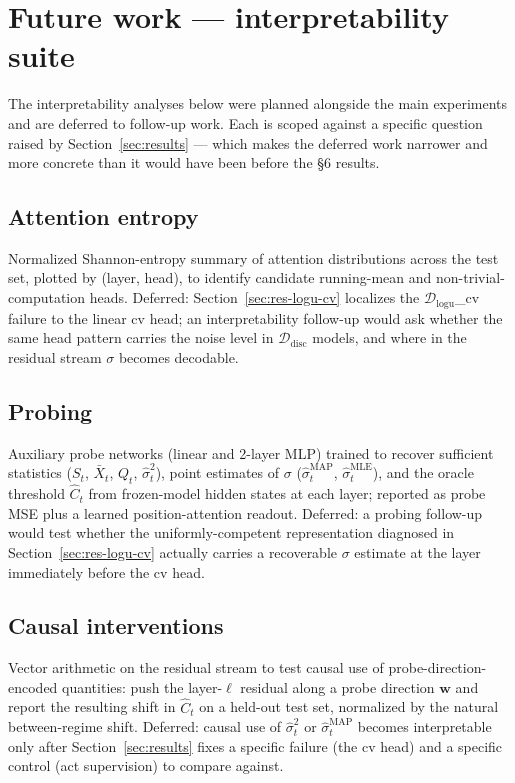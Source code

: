 \documentclass[11pt]{article}
\begin{document}
\section{Future work --- interpretability suite}
\label{sec:future}

The interpretability analyses below were planned alongside the main experiments and are deferred to follow-up work. Each is scoped against a specific question raised by Section~\ref{sec:results} --- which makes the deferred work narrower and more concrete than it would have been before the §6 results.

\subsection{Attention entropy}
\label{sec:fw-attn}

Normalized Shannon-entropy summary of attention distributions across the test set, plotted by (layer, head), to identify candidate running-mean and non-trivial-computation heads. Deferred: Section~\ref{sec:res-logu-cv} localizes the $\mathcal{D}_{\mathrm{logu}}$\_cv failure to the linear cv head; an interpretability follow-up would ask whether the same head pattern carries the noise level in $\mathcal{D}_{\mathrm{disc}}$ models, and where in the residual stream $\sigma$ becomes decodable.

\subsection{Probing}
\label{sec:fw-probe}

Auxiliary probe networks (linear and 2-layer MLP) trained to recover sufficient statistics ($S_t$, $\bar X_t$, $Q_t$, $\hat\sigma_t^2$), point estimates of $\sigma$ ($\hat\sigma_t^{\mathrm{MAP}}$, $\hat\sigma_t^{\mathrm{MLE}}$), and the oracle threshold $\widehat C_t$ from frozen-model hidden states at each layer; reported as probe MSE plus a learned position-attention readout. Deferred: a probing follow-up would test whether the uniformly-competent representation diagnosed in Section~\ref{sec:res-logu-cv} actually carries a recoverable $\sigma$ estimate at the layer immediately before the cv head.

\subsection{Causal interventions}
\label{sec:fw-intervention}

Vector arithmetic on the residual stream to test causal use of probe-direction-encoded quantities: push the layer-$\ell$ residual along a probe direction $\mathbf{w}$ and report the resulting shift in $\widehat C_t$ on a held-out test set, normalized by the natural between-regime shift. Deferred: causal use of $\hat\sigma_t^2$ or $\hat\sigma_t^{\mathrm{MAP}}$ becomes interpretable only after Section~\ref{sec:results} fixes a specific failure (the cv head) and a specific control (act supervision) to compare against.
\end{document}
